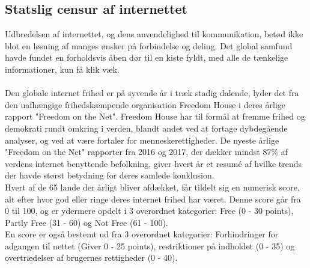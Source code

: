 \subsection{Statslig censur af internettet}
Udbredelsen af internettet, og dens anvendelighed til kommunikation, betød ikke blot en løsning af manges ønsker på forbindelse og deling. Det global samfund havde fundet en forholdsvis åben dør til en kiste fyldt, med alle de tænkelige informationer, kun få klik væk.
\\\\
\noindent
Den globale internet frihed er på syvende år i træk stadig dalende\cite{FreedomHouseRapport2017}, lyder det fra den uafhængige frihedskæmpende organisation Freedom House i deres årlige rapport "Freedom on the Net". Freedom House har til formål at fremme frihed og demokrati rundt omkring i verden, blandt andet ved at fortage dybdegående analyser, og ved at være fortaler for menneskerettigheder.\cite{FreedomHouseAbout} De nyeste årlige "Freedom on the Net" rapporter fra 2016 og 2017, der dækker mindst 87\% af verdens internet benyttende befolkning, giver hvert år et resumé af hvilke trends der havde størst betydning for deres samlede konklusion. \\
\noindent
Hvert af de 65 lande der årligt bliver afdækket, får tildelt sig en numerisk score, alt efter hvor god eller ringe deres internet frihed har været. Denne score går fra 0 til 100, og er ydermere opdelt i 3 overordnet kategorier: Free (0 - 30 points), Partly Free (31 - 60) og Not Free (61 - 100).\\ 
En score er også bestemt ud fra 3 overordnet kategorier: Forhindringer for adgangen til nettet (Giver 0 - 25 points), restriktioner på indholdet (0 - 35) og overtrædelser af brugernes rettigheder (0 - 40).\cite{FreedomHouseRapportMethodology}

